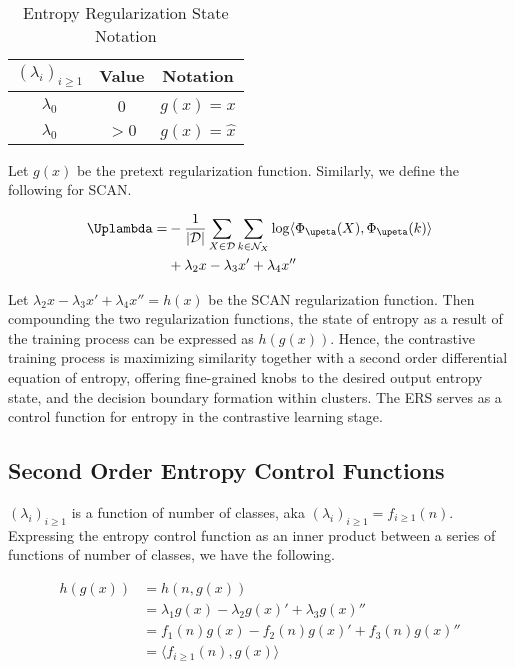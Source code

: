 \documentclass[10pt,twocolumn,letterpaper]{article}
\begin{document}
\begin{table}[h]
\centering
\caption{Entropy Regularization State Notation}
\label{tab:tabela1}
\begin{tabular}{|c|c|c|}
\hline
$(\lambda_{i})_{i \geq 1} $ & Value & Notation \\ \hline
$\lambda_{0}$ & 0 & $g(x) = x$ \\
$\lambda_{0}$ & $>0$ & $g(x) = \hat{x}$ \\
\hline
\end{tabular}
\end{table}

Let $g(x)$ be the pretext regularization function. Similarly, we define the following for SCAN. 

\begin{equation}
\begin{aligned}
    \Uplambda =   & -\frac{1}{|\mathcal{D}|} \sum_{X \in \mathcal{D}} \sum_{k \in \mathcal{N}_X} \log \langle \Phi_{\upeta}(X), \Phi_{\upeta}(k) \rangle \\ & + \lambda_{2} x - \lambda_{3}x' + \lambda_{4}x''
\end{aligned}
\end{equation}

Let $\lambda_{2} x - \lambda_{3}x' + \lambda_{4}x'' = h(x) $ be the SCAN regularization function. Then compounding the two regularization functions, the state of entropy as a result of the training process can be expressed as $h(g(x))$. Hence, the contrastive training process is maximizing similarity together with a second order differential equation of entropy, offering fine-grained knobs to the desired output entropy state, and the decision boundary formation within clusters. The ERS serves as a control function for entropy in the contrastive learning stage. 
\subsection{Second Order Entropy Control Functions}

$(\lambda_{i})_{i \geq 1}$ is a function of number of classes, aka $(\lambda_{i})_{i \geq 1} = f_{i \geq 1} (n) $. Expressing the entropy control function as an inner product between a series of functions of number of classes, we have the following. 

\begin{equation}
\begin{aligned}
    h(g(x)) & = h(n, g(x)) \\
            & = \lambda_{1}g(x) - \lambda_{2}g(x)' + \lambda_{3}g(x)'' \\
            & = f_{1}(n)g(x) - f_{2}(n)g(x)' + f_{3}(n)g(x)'' \\
            & = \langle f_{i \geq 1} (n), g(x) \rangle 
\end{aligned}
\end{equation}
\end{document}
